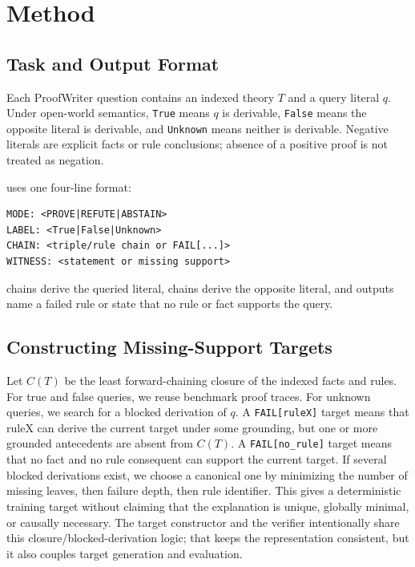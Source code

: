 \section{Method}
\label{sec:method}

\subsection{Task and Output Format}

Each ProofWriter question contains an indexed theory \(T\) and a query literal
\(q\). Under open-world semantics, \texttt{True} means \(q\) is derivable,
\texttt{False} means the opposite literal is derivable, and \texttt{Unknown}
means neither is derivable. Negative literals are explicit facts or rule
conclusions; absence of a positive proof is not treated as negation.

\model{} uses one four-line format:
\begin{verbatim}
MODE: <PROVE|REFUTE|ABSTAIN>
LABEL: <True|False|Unknown>
CHAIN: <triple/rule chain or FAIL[...]>
WITNESS: <statement or missing support>
\end{verbatim}
\prove{} chains derive the queried literal,  chains derive the
opposite literal, and \abstain{} outputs name a failed rule or state that no
rule or fact supports the query.

\subsection{Constructing Missing-Support Targets}

Let \(C(T)\) be the least forward-chaining closure of the indexed facts and
rules. For true and false queries, we reuse benchmark proof traces. For unknown
queries, we search for a blocked derivation of \(q\). A \texttt{FAIL[ruleX]}
target means that ruleX can derive the current target under some grounding, but
one or more grounded antecedents are absent from \(C(T)\). A
\texttt{FAIL[no\_rule]} target means that no fact and no rule consequent can
support the current target. If several blocked derivations exist, we choose a
canonical one by minimizing the number of missing leaves, then failure depth,
then rule identifier. This gives a deterministic training target without
claiming that the explanation is unique, globally minimal, or causally
necessary. The target constructor and the verifier intentionally share this
closure/blocked-derivation logic; that keeps the representation consistent, but
it also couples target generation and evaluation.

